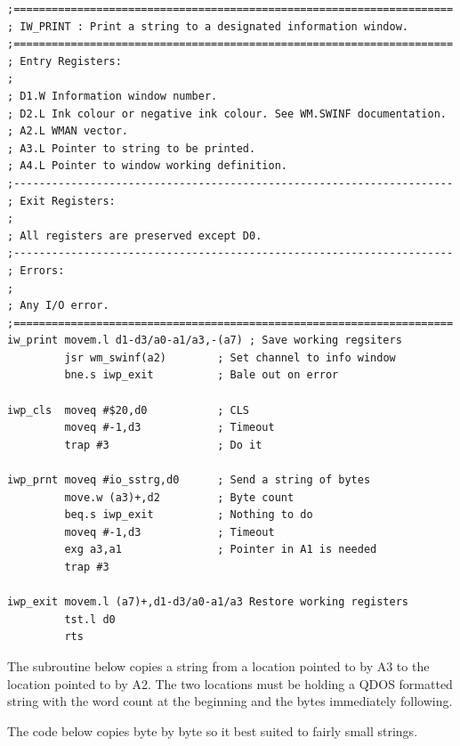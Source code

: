 \begin{lstlisting}[firstnumber=last,caption={QlToday\_pe\_utilities\_asm}]
;=====================================================================
; IW_PRINT : Print a string to a designated information window.
;=====================================================================
; Entry Registers:
;
; D1.W Information window number.
; D2.L Ink colour or negative ink colour. See WM.SWINF documentation.
; A2.L WMAN vector.
; A3.L Pointer to string to be printed.
; A4.L Pointer to window working definition.
;---------------------------------------------------------------------
; Exit Registers:
;
; All registers are preserved except D0.
;---------------------------------------------------------------------
; Errors:
;
; Any I/O error.
;=====================================================================
iw_print movem.l d1-d3/a0-a1/a3,-(a7) ; Save working regsiters
         jsr wm_swinf(a2)        ; Set channel to info window
         bne.s iwp_exit          ; Bale out on error

iwp_cls  moveq #$20,d0           ; CLS
         moveq #-1,d3            ; Timeout
         trap #3                 ; Do it

iwp_prnt moveq #io_sstrg,d0      ; Send a string of bytes
         move.w (a3)+,d2         ; Byte count
         beq.s iwp_exit          ; Nothing to do
         moveq #-1,d3            ; Timeout
         exg a3,a1               ; Pointer in A1 is needed
         trap #3

iwp_exit movem.l (a7)+,d1-d3/a0-a1/a3 Restore working registers
         tst.l d0
         rts
\end{lstlisting}

The subroutine below copies a string from a location pointed to by
    A3 to the location pointed to by A2. The two locations must be holding a
    QDOS formatted string with the word count at the beginning and the bytes
    immediately following.

The code below copies byte by byte so it best suited to fairly small
    strings.

